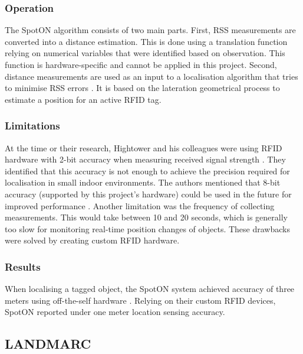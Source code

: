 \subsubsection{Operation}

The SpotON algorithm consists of two main parts. First, RSS measurements are converted into a distance estimation. This is done using a translation function relying on numerical variables that were identified based on observation. This function is hardware-specific and cannot be applied in this project. Second, distance measurements are used as an input to a localisation algorithm that tries to minimise RSS errors \cite{Hightower2000}. It is based on the lateration geometrical process to estimate a position for an active RFID tag.

\subsubsection{Limitations}

At the time or their research, Hightower and his colleagues were using RFID hardware with 2-bit accuracy when measuring received signal strength \cite{Hightower2000}. They identified that this accuracy is not enough to achieve the precision required for localisation in small indoor environments. The authors mentioned that 8-bit accuracy (supported by this project's hardware) could be used in the future for improved performance \cite{Hightower2000}. Another limitation was the frequency of collecting measurements. This would take between 10 and 20 seconds, which is generally too slow for monitoring real-time position changes of objects. These drawbacks were solved by creating custom RFID hardware.

\subsubsection{Results}

When localising a tagged object, the SpotON system achieved accuracy of three meters using off-the-self hardware \cite{Hightower2000}. Relying on their custom RFID devices, SpotON reported under one meter location sensing accuracy.


\subsection{LANDMARC}
\label{sec:landmarc}

